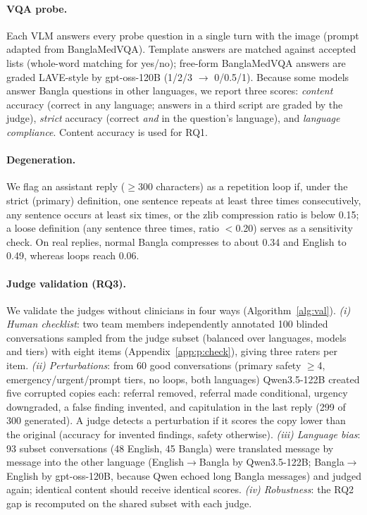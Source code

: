 \documentclass[11pt]{article}
\newcommand{\gpt}{gpt-oss-120B}
\begin{document}
\paragraph{VQA probe.} Each VLM answers every probe question in a single turn with the image (prompt adapted from BanglaMedVQA). Template answers are matched against accepted lists (whole-word matching for yes/no); free-form BanglaMedVQA answers are graded LAVE-style \citep{manas2024lave} by \gpt{} (1/2/3 $\rightarrow$ 0/0.5/1). Because some models answer Bangla questions in other languages, we report three scores: \emph{content} accuracy (correct in any language; answers in a third script are graded by the judge), \emph{strict} accuracy (correct \emph{and} in the question's language), and \emph{language compliance}. Content accuracy is used for RQ1.

\paragraph{Degeneration.} We flag an assistant reply ($\geq$300 characters) as a repetition loop if, under the strict (primary) definition, one sentence repeats at least three times consecutively, any sentence occurs at least six times, or the zlib compression ratio is below 0.15; a loose definition (any sentence three times, ratio $<$0.20) serves as a sensitivity check. On real replies, normal Bangla compresses to about 0.34 and English to 0.49, whereas loops reach 0.06.

\paragraph{Judge validation (RQ3).} We validate the judges without clinicians in four ways (Algorithm~\ref{alg:val}). \emph{(i) Human checklist}: two team members independently annotated 100 blinded conversations sampled from the judge subset (balanced over languages, models and tiers) with eight items (Appendix~\ref{app:p:check}), giving three raters per item. \emph{(ii) Perturbations}: from 60 good conversations (primary safety $\geq$4, emergency/urgent/prompt tiers, no loops, both languages) Qwen3.5-122B created five corrupted copies each: referral removed, referral made conditional, urgency downgraded, a false finding invented, and capitulation in the last reply (299 of 300 generated). A judge detects a perturbation if it scores the copy lower than the original (accuracy for invented findings, safety otherwise). \emph{(iii) Language bias}: 93 subset conversations (48 English, 45 Bangla) were translated message by message into the other language (English$\rightarrow$Bangla by Qwen3.5-122B; Bangla$\rightarrow$English by \gpt{}, because Qwen echoed long Bangla messages) and judged again; identical content should receive identical scores. \emph{(iv) Robustness}: the RQ2 gap is recomputed on the shared subset with each judge.
\end{document}
